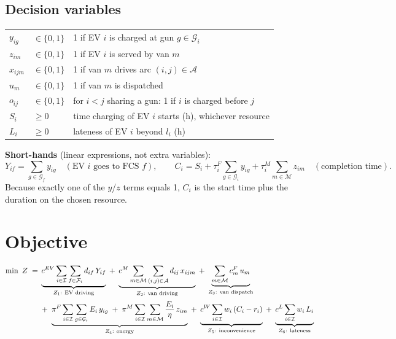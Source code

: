 \documentclass[11pt,a4paper]{article}
\newcommand{\I}{\mathcal{I}}
\newcommand{\F}{\mathcal{F}}
\newcommand{\G}{\mathcal{G}}
\newcommand{\M}{\mathcal{M}}
\newcommand{\A}{\mathcal{A}}
\begin{document}
\subsection*{Decision variables}
\begin{tabularx}{\textwidth}{@{}llX@{}}
\toprule
$y_{ig}$ & $\in\{0,1\}$ & 1 if EV $i$ is charged at gun $g\in\G_i$ \\
$z_{im}$ & $\in\{0,1\}$ & 1 if EV $i$ is served by van $m$ \\
$x_{ijm}$ & $\in\{0,1\}$ & 1 if van $m$ drives arc $(i,j)\in\A$ \\
$u_m$ & $\in\{0,1\}$ & 1 if van $m$ is dispatched \\
$o_{ij}$ & $\in\{0,1\}$ & for $i<j$ sharing a gun: 1 if $i$ is charged before $j$ \\
$S_i$ & $\ge 0$ & time charging of EV $i$ starts (h), whichever resource \\
$L_i$ & $\ge 0$ & lateness of EV $i$ beyond $l_i$ (h) \\
\bottomrule
\end{tabularx}

\textbf{Short-hands} (linear expressions, not extra variables):
\[
Y_{if}=\sum_{g\in\G_f} y_{ig}\quad(\text{EV $i$ goes to FCS $f$}),\qquad
C_i = S_i + \tau^F_i\sum_{g\in\G_i} y_{ig} + \tau^M_i\sum_{m\in\M} z_{im}\quad(\text{completion time}).
\]
Because exactly one of the $y$/$z$ terms equals 1, $C_i$ is the start time plus the duration on the chosen resource.

\section{Objective}

\begin{align}
\min\ Z \;=\;& \underbrace{c^{EV}\sum_{i\in\I}\sum_{f\in\F_i} d_{if}\,Y_{if}}_{Z_1:\ \text{EV driving}}
\;+\; \underbrace{c^{M}\sum_{m\in\M}\sum_{(i,j)\in\A} d_{ij}\,x_{ijm}}_{Z_2:\ \text{van driving}}
\;+\; \underbrace{\sum_{m\in\M} c^{F}_m\,u_m}_{Z_3:\ \text{van dispatch}} \notag\\[2pt]
&+\; \underbrace{\pi^F\sum_{i\in\I}\sum_{g\in\G_i} E_i\,y_{ig} \;+\; \pi^M\sum_{i\in\I}\sum_{m\in\M}\frac{E_i}{\eta}\,z_{im}}_{Z_4:\ \text{energy}}
\;+\; \underbrace{c^W\sum_{i\in\I} w_i\,(C_i - r_i)}_{Z_5:\ \text{inconvenience}}
\;+\; \underbrace{c^L\sum_{i\in\I} w_i\,L_i}_{Z_6:\ \text{lateness}} \label{eq:obj}
\end{align}
\end{document}
